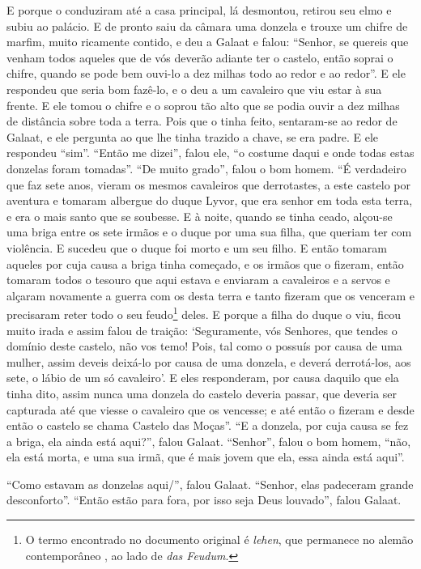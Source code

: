 E porque o conduziram até a casa principal, lá desmontou, retirou seu elmo e
subiu ao palácio. E de pronto saiu da câmara uma donzela e trouxe um chifre de
marfim, muito ricamente contido, e deu a Galaat e falou: “Senhor, se quereis
que venham todos aqueles que de vós deverão adiante ter o castelo, então soprai
o chifre, quando se pode bem ouvi-lo a dez milhas todo ao redor e ao redor”. E
ele respondeu que seria bom fazê-lo, e o deu a um cavaleiro que viu estar à sua
frente. E ele tomou o chifre e o soprou tão alto que se podia ouvir a dez
milhas de distância sobre toda a terra. Pois que o tinha feito, sentaram-se ao
redor de Galaat, e ele pergunta ao que lhe tinha trazido a chave, se era padre.
E ele respondeu “sim”. “Então me dizei”, falou ele, “o costume daqui e onde
todas estas donzelas foram tomadas”. “De muito grado”, falou o bom homem. “É
verdadeiro que faz sete anos, vieram os mesmos cavaleiros que derrotastes, a
este castelo por aventura e tomaram albergue do duque Lyvor, que era senhor em
toda esta terra, e era o mais santo que se soubesse. E à noite, quando se tinha
ceado, alçou-se uma briga entre os sete irmãos e o duque por uma sua filha, que
queriam ter com violência. E sucedeu que o duque foi morto e um seu filho. E
então tomaram aqueles por cuja causa a briga tinha começado, e os irmãos que o
fizeram, então tomaram todos o tesouro que aqui estava e enviaram a cavaleiros
e a servos e alçaram novamente a guerra com os desta terra e tanto fizeram que
os venceram e precisaram reter todo o seu feudo\footnote{ O termo encontrado no
documento original é\textit{ lehen}, que permanece no alemão contemporâneo
, ao lado de \textit{das Feudum}.} deles. E porque
a filha do duque o viu, ficou muito irada e assim falou de traição:
‘Seguramente, vós Senhores, que tendes o domínio deste castelo, não vos temo!
Pois, tal como o possuís por causa de uma mulher, assim deveis deixá-lo por
causa de uma donzela, e deverá derrotá-los, aos sete, o lábio de um só
cavaleiro’. E eles responderam, por causa daquilo que ela tinha dito, assim
nunca uma donzela do castelo deveria passar, que deveria ser capturada até que
viesse o cavaleiro que os vencesse; e até então o fizeram e desde então o
castelo se chama Castelo das Moças”. “E a donzela, por cuja causa se fez a
briga, ela ainda está aqui?”, falou Galaat. “Senhor”, falou o bom homem, “não,
ela está morta, e uma sua irmã, que é mais jovem que ela, essa ainda está
aqui”. 

“Como estavam as donzelas aqui/”, falou Galaat. “Senhor, elas padeceram grande
desconforto”. “Então estão para fora, por isso seja Deus louvado”, falou Galaat. 

